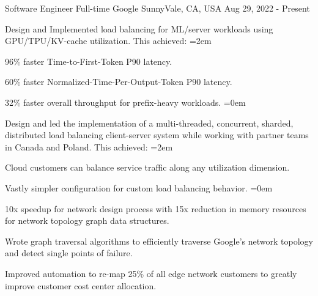 
\begin{cventries}
  \cventry
    {Software Engineer Full-time} %
    {Google} %
    {SunnyVale, CA, USA} %
    {Aug 29, 2022 - Present} %
    {
      \begin{cvitems} %
        \item {Design and Implemented load balancing for ML/server workloads
          using GPU/TPU/KV-cache utilization. This achieved:}
        \itemindent=2em
          \item {96\% faster Time-to-First-Token P90 latency.}
          \item {60\% faster Normalized-Time-Per-Output-Token P90 latency.}
          \item {32\% faster overall throughput for prefix-heavy workloads.}
        \itemindent=0em
        \item {Design and led the implementation of a multi-threaded,
          concurrent, sharded, distributed load balancing client-server system
          while working with partner teams in Canada and Poland. This achieved:}
        \itemindent=2em
        \item {Cloud customers can balance service traffic along any
          utilization dimension.}
        \item {Vastly simpler configuration for custom load balancing behavior.}
        \itemindent=0em
        \item {10x speedup for network design process with 15x reduction in
          memory resources for network topology graph data structures.}
        \item {Wrote graph traversal algorithms to efficiently traverse Google's
          network topology and detect single points of failure.}
        \item {Improved automation to re-map 25\% of all edge network customers
          to greatly improve customer cost center allocation.}
      \end{cvitems}
    }


\end{cventries}

